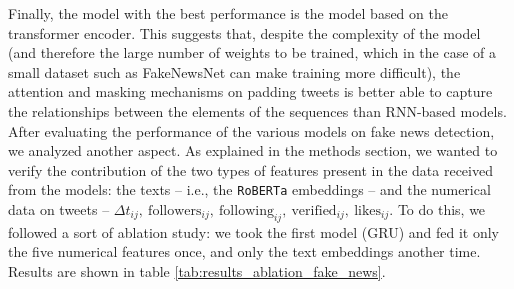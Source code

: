 \documentclass[a4paper,twoside,12pt]{book}
\begin{document}
Finally, the model with the best performance is the model based on the transformer encoder. This suggests that, despite the complexity of the model (and therefore the large number of weights to be trained, which in the case of a small dataset such as FakeNewsNet can make training more difficult), the attention and masking mechanisms on padding tweets is better able to capture the relationships between the elements of the sequences than RNN-based models.\\ 


After evaluating the performance of the various models on fake news detection, we analyzed another aspect. As explained in the methods section, we wanted to verify the contribution of the two types of features present in the data received from the models: the texts -- i.e., the \texttt {RoBERTa} embeddings -- and the numerical data on tweets -- $\Delta t_{ij},\ \text{followers}_{ij},\ \text{following}_{ij}, \ \allowbreak \text{verified}_{ij},\ \text{likes}_{ij}$. To do this, we followed a sort of ablation study: we took the first model (GRU) and fed it only the five numerical features once, and only the text embeddings another time. Results are shown in table \ref{tab:results_ablation_fake_news}. \\

\begin{table}[h!]
	\centering
	\caption{GRU performance comparison on fake news detection with limited input features (Cross-Validation Averages)}
	\vspace{0.5em}
	\label{tab:results_ablation_fake_news}
\end{table}
\end{document}
